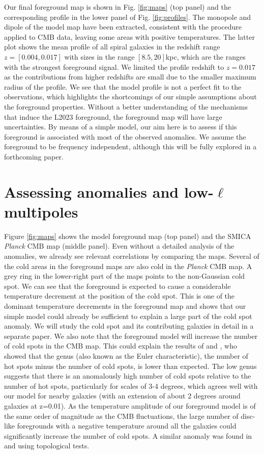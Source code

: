 \documentclass{aa}
\begin{document}
Our final foreground map is shown in Fig. \ref{fig:maps} (top panel) and the corresponding profile in the lower panel of Fig. \ref{fig:profiles}. The monopole and dipole of the model map have been extracted, consistent with the procedure applied to CMB data, leaving some areas with positive temperatures. The latter plot shows the mean profile of all spiral galaxies in the redshift range $z=[0.004, 0.017]$ with sizes in the range $[8.5,20]$\;kpc, which are the ranges with the strongest foreground signal. We limited the profile redshift to $z=0.017$ as the contributions from higher redshifts are small due to the smaller maximum radius of the profile. We see that the model profile is not a perfect fit to the observations, which highlights the shortcomings of our simple assumptions about the foreground properties. Without a better understanding of the mechanisms that induce the L2023 foreground, the foreground map will have large uncertainties. By means of a simple model, our aim here is to assess if this foreground is associated with most of the observed anomalies. We assume the foreground to be frequency independent, although this will be fully explored in a forthcoming paper.

\section{Assessing anomalies and low-$\ell$ multipoles}

Figure \ref{fig:maps} shows the model foreground map (top panel) and the SMICA \textit{Planck} CMB map (middle panel). Even without a detailed analysis of the anomalies, we already see relevant correlations by comparing the maps. Several of the cold areas in the foreground maps are also cold in the \textit{Planck} CMB map. A grey ring in the lower-right part of the maps points to the non-Gaussian cold spot. We can see that the foreground is expected to cause a considerable temperature decrement at the position of the cold spot. This is one of the dominant temperature decrements in the foreground map and shows that our simple model could already be sufficient to explain a large part of the cold spot anomaly. We will study the cold spot and its contributing galaxies in detail in a separate paper. We also note that the foreground model will increase the number of cold spots in the CMB map. This could explain the results of \citet{minkowski1} and \citet{minkowski2}, who showed that the genus (also known as the Euler characteristic), the number of hot spots minus the number of cold spots, is lower than expected. The low genus suggests that there is an anomalously high number of cold spots relative to the number of hot spots, particularly for scales of 3-4 degrees, which agrees well with our model for nearby galaxies (with an extension of about 2 degrees around galaxies at z=0.01). As the temperature amplitude of our foreground model is of the same order of magnitude as the CMB fluctuations, the large number of disc-like foregrounds with a negative temperature around all the galaxies could significantly increase the number of cold spots. A similar anomaly was found in \cite{topology1} and \cite{topology2} using topological tests.
\end{document}
